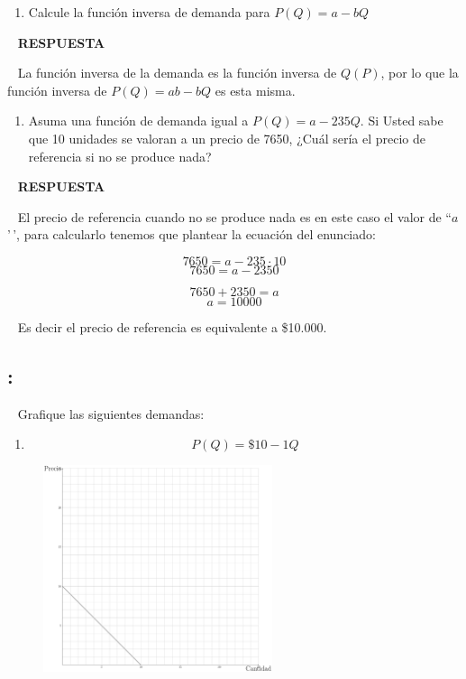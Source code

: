 \documentclass[
  letterpaper,
  DIV=11,
  numbers=noendperiod]{scrreport}
\providecommand{\tightlist}{%
  \setlength{\itemsep}{0pt}\setlength{\parskip}{0pt}}\usepackage{longtable,booktabs,array}
\begin{document}
\begin{enumerate}
\def\labelenumi{\arabic{enumi})}
\setcounter{enumi}{1}
\tightlist
\item
  Calcule la función inversa de demanda para \(P(Q)=a-bQ\)
\end{enumerate}

~ \textbf{RESPUESTA}

~ La función inversa de la demanda es la función inversa de \(Q(P)\),
por lo que la función inversa de \(P(Q)=ab-bQ\) es esta misma.

\begin{enumerate}
\def\labelenumi{\arabic{enumi})}
\setcounter{enumi}{2}
\tightlist
\item
  Asuma una función de demanda igual a \(P(Q)=a-235Q\). Si Usted sabe
  que 10 unidades se valoran a un precio de 7650, ¿Cuál sería el precio
  de referencia si no se produce nada?
\end{enumerate}

~ \textbf{RESPUESTA}

~ El precio de referencia cuando no se produce nada es en este caso el
valor de ``\(a\)'\,', para calcularlo tenemos que plantear la ecuación
del enunciado:

\[
7650=a-235\cdot 10
\] \[
7650=a-2350
\]

\[
7650+2350=a
\] \[
a=10000
\]

~ Es decir el precio de referencia es equivalente a \$10.000.

\newpage

\hypertarget{section-26}{%
\subsection{:}\label{section-26}}

~ Grafique las siguientes demandas:

\begin{enumerate}
\def\labelenumi{\arabic{enumi})}
\tightlist
\item
  \[
  P(Q)=\$10 - 1Q
  \]
\end{enumerate}

\begin{figure}

{\centering \includegraphics[width=0.6\textwidth,height=\textheight]{8ej_pauta_files/figure-pdf/unnamed-chunk-3-1.pdf}

}

\end{figure}
\end{document}
